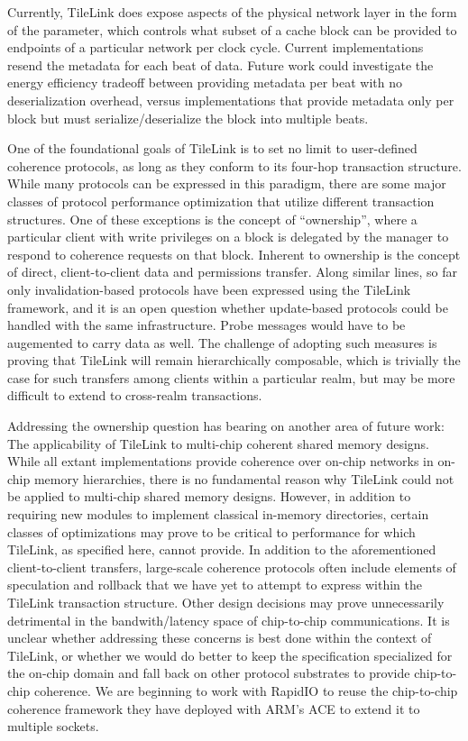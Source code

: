 Currently, TileLink does expose aspects of the physical network layer in the form of the  parameter, which
controls what subset of a cache block can be provided to endpoints of a particular network per clock cycle.
Current implementations resend the metadata for each beat of data.
Future work could investigate the energy efficiency tradeoff between providing metadata per beat with no deserialization overhead,
versus implementations that provide metadata only per block but must serialize/deserialize the block into multiple beats. 

One of the foundational goals of TileLink is to set no limit to user-defined coherence protocols, as long as they conform to
its four-hop transaction structure.
While many protocols can be expressed in this paradigm, there are some major classes of protocol performance optimization that
utilize different transaction structures.
One of these exceptions is the concept of ``ownership'', where a particular client with write privileges on a block is delegated by the manager
to respond to coherence requests on that block.
Inherent to ownership is the concept of direct, client-to-client data and permissions transfer.
Along similar lines, so far only invalidation-based protocols have been expressed using the TileLink framework, and it is an open question whether update-based protocols could be handled with the same infrastructure.
Probe messages would have to be augemented to carry data as well.
The challenge of adopting such measures is proving that TileLink will remain hierarchically composable,
which is trivially the case for such transfers among clients within a particular realm,
but may be more difficult to extend to cross-realm transactions.

Addressing the ownership question has bearing on another area of future work:
The applicability of TileLink to multi-chip coherent shared memory designs.
While all extant implementations provide coherence over on-chip networks in on-chip memory hierarchies,
there is no fundamental reason why TileLink could not be applied to multi-chip shared memory designs.
However, in addition to requiring new modules to implement classical in-memory directories,
certain classes of optimizations may prove to be critical to performance for which TileLink, as specified here, cannot provide.
In addition to the aforementioned client-to-client transfers, large-scale coherence protocols often include
elements of speculation and rollback that we have yet to attempt to express within the TileLink transaction structure.
Other design decisions may prove unnecessarily detrimental in the bandwith/latency space of chip-to-chip communications.
It is unclear whether addressing these concerns is best done within the context of TileLink, or whether we would
do better to keep the specification specialized for the on-chip domain and fall back on other
protocol substrates to provide chip-to-chip coherence.
We are beginning to work with RapidIO to reuse the chip-to-chip coherence framework
they have deployed with ARM's ACE to extend it to multiple sockets.

